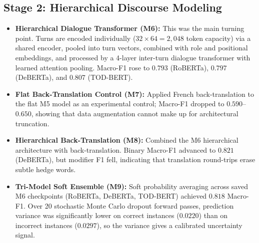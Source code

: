 \subsection{Stage 2: Hierarchical Discourse Modeling}
\begin{itemize}
  \item \textbf{Hierarchical Dialogue Transformer (M6):} This was the main turning point. Turns are encoded individually ($32 \times 64 = 2{,}048$ token capacity) via a shared encoder, pooled into turn vectors, combined with role and positional embeddings, and processed by a 4-layer inter-turn dialogue transformer with learned attention pooling. Macro-F1 rose to \textbf{$0.793$} (RoBERTa), \textbf{$0.797$} (DeBERTa), and \textbf{$0.807$} (TOD-BERT).
  \item \textbf{Flat Back-Translation Control (M7):} Applied French back-translation to the flat M5 model as an experimental control; Macro-F1 dropped to $0.590$--$0.650$, showing that data augmentation cannot make up for architectural truncation.
  \item \textbf{Hierarchical Back-Translation (M8):} Combined the M6 hierarchical architecture with back-translation. Binary Macro-F1 advanced to \textbf{$0.821$} (DeBERTa), but modifier F1 fell, indicating that translation round-trips erase subtle hedge words.
  \item \textbf{Tri-Model Soft Ensemble (M9):} Soft probability averaging across saved M6 checkpoints (RoBERTa, DeBERTa, TOD-BERT) achieved $0.818$ Macro-F1. Over 20 stochastic Monte Carlo dropout forward passes, prediction variance was significantly lower on correct instances ($0.0220$) than on incorrect instances ($0.0297$), so the variance gives a calibrated uncertainty signal.
\end{itemize}

